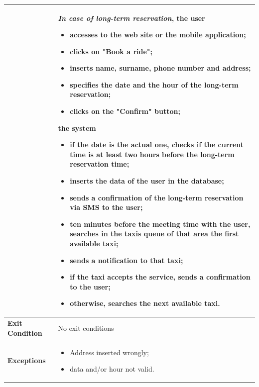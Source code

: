   \newpage
 \begin{tabular}{l l}
 & \parbox{0.7\textwidth}{
 \emph{In case of long-term reservation}, the user
 \begin{itemize}
 \item accesses to the web site or the mobile application;
 \item clicks on "Book a ride";
 \item inserts name, surname, phone number and address;
 \item specifies the date and the hour of the long-term reservation;
 \item clicks on the "Confirm" button;
 \end{itemize}
 the system
 \begin{itemize}
 \item if the date is the actual one, checks if the current time is at least two hours before the long-term reservation time;
 \item inserts the data of the user in the database;
 \item sends a confirmation of the long-term reservation via SMS to the user;
 \item ten minutes before the meeting time with the user, searches in the taxis queue of that area the first available taxi;
 \item sends a notification to that taxi;
 \item if the taxi accepts the service, sends a confirmation to the user;
 \item otherwise, searches the next available taxi.
 \end{itemize}
 } \\ \hline
 \textbf{Exit Condition} & No exit conditions \\ \hline
 \textbf{Exceptions} &  \parbox{0.7\textwidth}{ 
 \begin{itemize}
 \item Address inserted wrongly;
 \item data and/or hour not valid.
 \end{itemize}
 }
\end{tabular}

